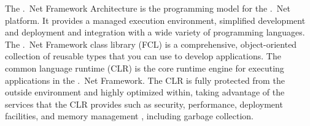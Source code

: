 The .\ Net Framework Architecture is the programming model for the .\ Net platform. It provides a managed execution environment, simplified development and deployment and integration with a wide variety of programming languages. The .\ Net Framework class library (FCL) is a comprehensive, object-oriented collection of reusable types that you can use to develop applications. The common language runtime (CLR) is the core runtime engine for executing applications in the .\ Net Framework. The CLR is fully protected from the outside environment and highly optimized within, taking advantage of the services that the CLR provides such as security, performance, deployment facilities, and memory management , including garbage collection.

%
%
%
%
